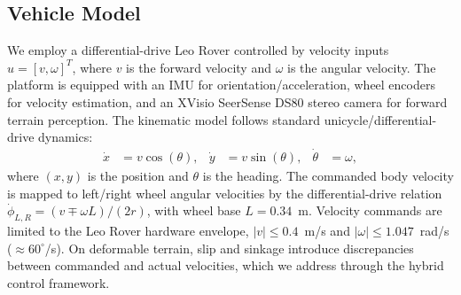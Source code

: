\documentclass[conference]{IEEEtran}
\begin{document}
\subsection{Vehicle Model}
We employ a differential-drive Leo Rover controlled by velocity inputs $u = [v, \omega]^T$, where $v$ is the forward velocity and $\omega$ is the angular velocity. The platform is equipped with an IMU for orientation/acceleration, wheel encoders for velocity estimation, and an XVisio SeerSense DS80 stereo camera for forward terrain perception. The kinematic model follows standard unicycle/differential-drive dynamics:
\begin{align}
\dot{x} &= v \cos(\theta), &
\dot{y} &= v \sin(\theta), &
\dot{\theta} &= \omega,
\end{align}
where $(x, y)$ is the position and $\theta$ is the heading. The commanded body velocity is mapped to left/right wheel angular velocities by the differential-drive relation $\dot{\phi}_{L,R} = (v \mp \omega L)/(2r)$, with wheel base $L = 0.34$~m. Velocity commands are limited to the Leo Rover hardware envelope, $|v| \le 0.4$~m/s and $|\omega| \le 1.047$~rad/s ($\approx 60^\circ$/s). On deformable terrain, slip and sinkage introduce discrepancies between commanded and actual velocities, which we address through the hybrid control framework.
\end{document}
